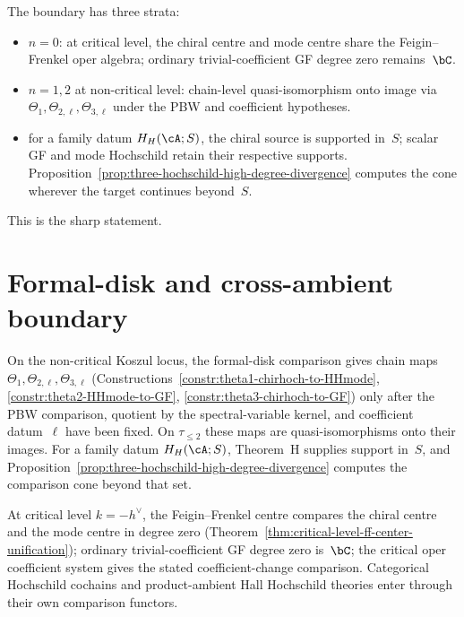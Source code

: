 \begin{remark}
\label{rem:three-hochschild-chain-cohomology-boundary}
The boundary has three strata:
\begin{itemize}[nosep]
\item $n=0$: at critical level, the chiral centre and mode centre
 share the Feigin--Frenkel oper algebra; ordinary
 trivial-coefficient GF degree zero remains~$\bC$.
\item $n=1,2$ at non-critical level: chain-level quasi-isomorphism
 onto image via $\Theta_1,\Theta_{2,\ell},\Theta_{3,\ell}$ under the
 PBW and coefficient hypotheses.
\item for a family datum $H_H(\cA;S)$, the chiral source is supported
 in~$S$; scalar GF and mode Hochschild retain their respective
 supports.  Proposition~\ref{prop:three-hochschild-high-degree-divergence}
 computes the cone wherever the target continues beyond~$S$.
\end{itemize}
This is the sharp statement.
\end{remark}

\section{Formal-disk and cross-ambient boundary}
\label{sec:three-hochschild-consequences}

\begin{corollary}
\label{cor:three-hochschild-scoped-comparison}
\ClaimStatusConditional
On the non-critical Koszul locus, the formal-disk comparison gives
chain maps
$\Theta_1,\Theta_{2,\ell},\Theta_{3,\ell}$
(Constructions~\ref{constr:theta1-chirhoch-to-HHmode},
\ref{constr:theta2-HHmode-to-GF},
\ref{constr:theta3-chirhoch-to-GF}) only after the PBW comparison,
quotient by the spectral-variable kernel, and coefficient datum~$\ell$
have been fixed. On $\tau_{\le 2}$ these maps are
quasi-isomorphisms onto their images.  For a family datum
$H_H(\cA;S)$, Theorem~H supplies support in~$S$, and
Proposition~\ref{prop:three-hochschild-high-degree-divergence}
computes the comparison cone beyond that set.

At critical level $k=-h^\vee$, the Feigin--Frenkel centre compares
the chiral centre and the mode centre in degree zero
(Theorem~\ref{thm:critical-level-ff-center-unification}); ordinary
trivial-coefficient GF degree zero is~$\bC$; the critical oper
coefficient system gives the stated coefficient-change comparison.
Categorical Hochschild cochains and product-ambient Hall Hochschild
theories enter through their own comparison functors.
\end{corollary}

